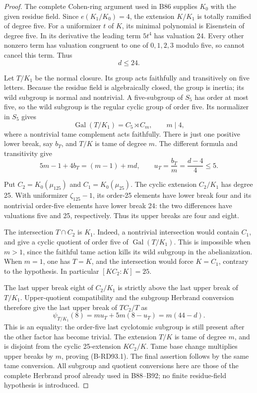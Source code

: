 \begin{proof}
The complete Cohen-ring argument used in B86 supplies \(K_0\)
with the given residue field. Since \(e(K_1/K_0)=4\),
the extension \(K/K_1\) is totally ramified of degree five.
For a uniformizer \(t\) of \(K\), its minimal polynomial is
Eisenstein of degree five. In its derivative the leading term
\(5t^4\) has valuation 24. Every other nonzero term has valuation
congruent to one of \(0,1,2,3\) modulo five, so cannot cancel
this term. Thus
\[
                                  d\le24.              \tag{B-RD93.2}
\]

Let \(T/K_1\) be the normal closure. Its group acts faithfully
and transitively on five letters. Because the residue field is
algebraically closed, the group is inertia; its wild subgroup is
normal and nontrivial. A five-subgroup of \(S_5\) has order at
most five, so the wild subgroup is the regular cyclic group of
order five. Its normalizer in \(S_5\) gives
\[
 \operatorname{Gal}(T/K_1)=C_5\rtimes C_m,\qquad m\mid4,
\]
where a nontrivial tame complement acts faithfully. There is just
one positive lower break, say \(b_T\), and \(T/K\) is tame of
degree \(m\). The different formula and transitivity give
\[
 5m-1+4b_T=(m-1)+md,
 \qquad u_T=\frac{b_T}{m}=\frac{d-4}{4}\le5.            \tag{B-RD93.3}
\]

Put \(C_2=K_0(\mu _{125})\) and \(C_1=K_0(\mu _{25})\).
The cyclic extension \(C_2/K_1\) has degree 25. With uniformizer
\(\zeta_{125}-1\), its order-25 elements have lower break four
and its nontrivial order-five elements have lower break 24:
the two differences have valuations five and 25, respectively.
Thus its upper breaks are four and eight.

The intersection \(T\cap C_2\) is \(K_1\). Indeed, a nontrivial
intersection would contain \(C_1\), and give a cyclic quotient
of order five of \(\operatorname{Gal}(T/K_1)\). This is impossible
when \(m>1\), since the faithful tame action kills its wild
subgroup in the abelianization. When \(m=1\), one has \(T=K\),
and the intersection would force \(K=C_1\), contrary to the
hypothesis. In particular \([KC_2:K]=25\).

The last upper break eight of \(C_2/K_1\) is strictly above
the last upper break of \(T/K_1\). Upper-quotient compatibility
and the subgroup Herbrand conversion therefore give the last
upper break of \(TC_2/T\) as
\[
 \psi_{T/K_1}(8)
 =m u_T+5m(8-u_T)=m(44-d).                            \tag{B-RD93.4}
\]
This is an equality: the order-five last cyclotomic subgroup
is still present after the other factor has become trivial.
The extension \(T/K\) is tame of degree \(m\), and is disjoint
from the cyclic 25-extension \(KC_2/K\). Tame base change
multiplies upper breaks by \(m\), proving (B-RD93.1).
The final assertion follows by the same tame conversion.
All subgroup and quotient conversions here are those of the
complete Herbrand proof already used in B88--B92; no finite
residue-field hypothesis is introduced.
\end{proof}

